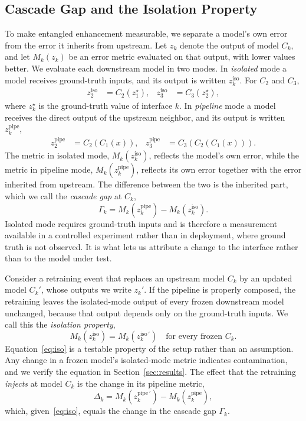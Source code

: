 \documentclass[conference]{IEEEtran}
\begin{document}
\subsection{Cascade Gap and the Isolation Property}
\label{sec:dualmode}
To make entangled enhancement measurable, we separate a model's own error from
the error it inherits from upstream. Let $z_k$ denote the output of model $C_k$,
and let $M_k(z_k)$ be an error metric evaluated on that output, with lower values
better. We evaluate each downstream model in two modes. In \emph{isolated} mode a
model receives ground-truth inputs, and its output is written $z_k^{\text{iso}}$.
For $C_2$ and $C_3$,
\begin{align}
z_2^{\text{iso}} &= C_2(z_1^{\star}), &
z_3^{\text{iso}} &= C_3(z_2^{\star}),
\label{eq:iso-mode}
\end{align}
where $z_k^{\star}$ is the ground-truth value of interface $k$. In \emph{pipeline}
mode a model receives the direct output of the upstream neighbor, and its output is
written $z_k^{\text{pipe}}$,
\begin{align}
z_2^{\text{pipe}} &= C_2(C_1(x)), &
z_3^{\text{pipe}} &= C_3(C_2(C_1(x))).
\label{eq:pipe-mode}
\end{align}
The metric in isolated mode, $M_k(z_k^{\text{iso}})$, reflects the model's own
error, while the metric in pipeline mode, $M_k(z_k^{\text{pipe}})$, reflects its
own error together with the error inherited from upstream. The difference between
the two is the inherited part, which we call the \emph{cascade gap} at $C_k$,
\begin{equation}
\Gamma_k = M_k(z_k^{\text{pipe}}) - M_k(z_k^{\text{iso}}).
\label{eq:gap}
\end{equation}
Isolated mode requires ground-truth inputs and is therefore a measurement
available in a controlled experiment rather than in deployment, where ground
truth is not observed. It is what lets us attribute a change to the interface
rather than to the model under test.

Consider a retraining event that replaces an upstream model $C_k$ by an updated
model $C_k'$, whose outputs we write $z_k'$. If the pipeline is properly composed,
the retraining leaves the isolated-mode output of every frozen downstream model
unchanged, because that output depends only on the ground-truth inputs. We call
this the \emph{isolation property},
\begin{equation}
M_k(z_k^{\text{iso}}) = M_k(z_k^{\text{iso}\,\prime})
\quad \text{for every frozen } C_k.
\label{eq:iso}
\end{equation}
Equation~\eqref{eq:iso} is a testable property of the setup rather than an
assumption. Any change in a frozen model's isolated-mode metric indicates
contamination, and we verify the equation in Section~\ref{sec:results}. The effect
that the retraining \emph{injects} at model $C_k$ is the change in its pipeline
metric,
\begin{equation}
\Delta_k = M_k(z_k^{\text{pipe}\,\prime}) - M_k(z_k^{\text{pipe}}),
\label{eq:inj}
\end{equation}
which, given~\eqref{eq:iso}, equals the change in the cascade gap $\Gamma_k$.
\end{document}
